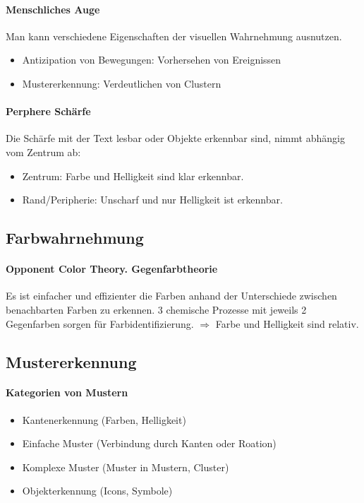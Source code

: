 \documentclass[ngerman]{scrartcl}
\begin{document}
\paragraph{Menschliches Auge} Man kann verschiedene Eigenschaften der visuellen Wahrnehmung ausnutzen. 
\begin{itemize}
  \item Antizipation von Bewegungen: Vorhersehen von Ereignissen
  \item Mustererkennung: Verdeutlichen von Clustern
\end{itemize}

\paragraph{Perphere Schärfe} Die Schärfe mit der Text lesbar oder Objekte erkennbar sind, nimmt abhängig vom Zentrum ab: 
\begin{itemize}
  \item Zentrum: Farbe und Helligkeit sind klar erkennbar.
  \item Rand/Peripherie: Unscharf und nur Helligkeit ist erkennbar.
\end{itemize}

\subsection{Farbwahrnehmung}

\paragraph{Opponent Color Theory. Gegenfarbtheorie}
Es ist einfacher und effizienter die Farben anhand der Unterschiede zwischen benachbarten Farben zu erkennen. 3 chemische Prozesse mit jeweils 2 Gegenfarben sorgen für Farbidentifizierung. $ \Rightarrow $ Farbe und Helligkeit sind relativ.



\subsection{Mustererkennung}
\paragraph{Kategorien von Mustern}
\begin{itemize}
  \item Kantenerkennung (Farben, Helligkeit)
  \item Einfache Muster (Verbindung durch Kanten oder Roation)
  \item Komplexe Muster (Muster in Mustern, Cluster)
  \item Objekterkennung (Icons, Symbole)
\end{itemize}
\end{document}
